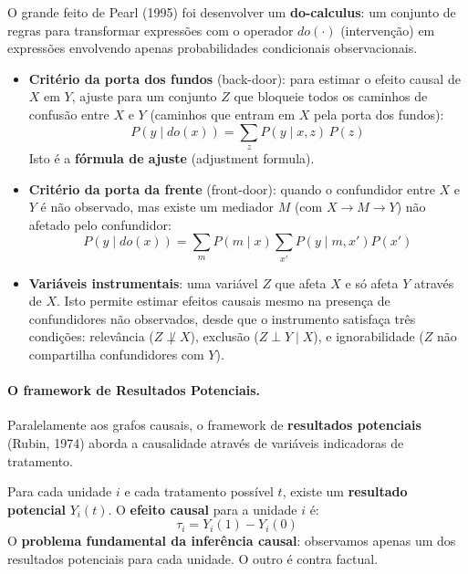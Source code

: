 \documentclass{tufte-handout}
\begin{document}
O grande feito de Pearl (1995) foi desenvolver um \textbf{do-calculus}: um conjunto
de regras para transformar expressões com o operador $do(\cdot)$ (intervenção) em
expressões envolvendo apenas probabilidades condicionais observacionais.

\begin{itemize}
    \item \textbf{Critério da porta dos fundos} (back-door): para estimar o efeito
    causal de $X$ em $Y$, ajuste para um conjunto $Z$ que bloqueie todos os caminhos
    de confusão entre $X$ e $Y$ (caminhos que entram em $X$ pela porta dos fundos):
    \[
    P(y \mid do(x)) = \sum_z P(y \mid x, z) \, P(z)
    \]
    Isto é a \textbf{fórmula de ajuste} (adjustment formula).

    \item \textbf{Critério da porta da frente} (front-door): quando o confundidor
    entre $X$ e $Y$ é não observado, mas existe um mediador $M$ (com $X \to M \to Y$)
    não afetado pelo confundidor:
    \[
    P(y \mid do(x)) = \sum_m P(m \mid x) \sum_{x'} P(y \mid m, x') P(x')
    \]

    \item \textbf{Variáveis instrumentais}: uma variável $Z$ que afeta $X$ e só
    afeta $Y$ através de $X$. Isto permite estimar efeitos causais mesmo na
    presença de confundidores não observados, desde que o instrumento satisfaça
    três condições: relevância ($Z \not\perp X$), exclusão ($Z \perp Y \mid X$), e
    ignorabilidade ($Z$ não compartilha confundidores com $Y$).
\end{itemize}

\paragraph{O framework de Resultados Potenciais.}

Paralelamente aos grafos causais, o framework de \textbf{resultados potenciais}
(Rubin, 1974) aborda a causalidade através de variáveis indicadoras de tratamento.

\begin{defn}
    Para cada unidade $i$ e cada tratamento possível $t$, existe um \textbf{resultado
    potencial} $Y_i(t)$. O \textbf{efeito causal} para a unidade $i$ é:
    \[
    \tau_i = Y_i(1) - Y_i(0)
    \]
    O \textbf{problema fundamental da inferência causal}: observamos apenas um dos
    resultados potenciais para cada unidade. O outro é contra factual.
\end{defn}
\end{document}
